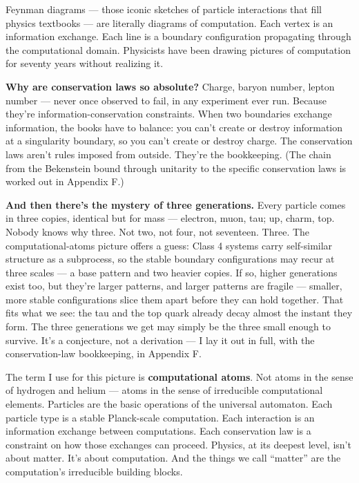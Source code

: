 \documentclass[11pt, twoside, openright]{book}
\begin{document}
Feynman diagrams --- those iconic sketches of particle interactions that fill physics textbooks --- are literally diagrams of computation. Each vertex is an information exchange. Each line is a boundary configuration propagating through the computational domain. Physicists have been drawing pictures of computation for seventy years without realizing it.

\textbf{Why are conservation laws so absolute?} Charge, baryon number, lepton number --- never once observed to fail, in any experiment ever run. Because they're information-conservation constraints. When two boundaries exchange information, the books have to balance: you can't create or destroy information at a singularity boundary, so you can't create or destroy charge. The conservation laws aren't rules imposed from outside. They're the bookkeeping. (The chain from the Bekenstein bound through unitarity to the specific conservation laws is worked out in Appendix F.)

\textbf{And then there's the mystery of three generations.} Every particle comes in three copies, identical but for mass --- electron, muon, tau; up, charm, top. Nobody knows why three. Not two, not four, not seventeen. Three. The computational-atoms picture offers a guess: Class 4 systems carry self-similar structure as a subprocess, so the stable boundary configurations may recur at three scales --- a base pattern and two heavier copies. If so, higher generations exist too, but they're larger patterns, and larger patterns are fragile --- smaller, more stable configurations slice them apart before they can hold together. That fits what we see: the tau and the top quark already decay almost the instant they form. The three generations we get may simply be the three small enough to survive. It's a conjecture, not a derivation --- I lay it out in full, with the conservation-law bookkeeping, in Appendix F.

The term I use for this picture is \textbf{computational atoms}. Not atoms in the sense of hydrogen and helium --- atoms in the sense of irreducible computational elements. Particles are the basic operations of the universal automaton. Each particle type is a stable Planck-scale computation. Each interaction is an information exchange between computations. Each conservation law is a constraint on how those exchanges can proceed. Physics, at its deepest level, isn't about matter. It's about computation. And the things we call ``matter'' are the computation's irreducible building blocks.
\end{document}
